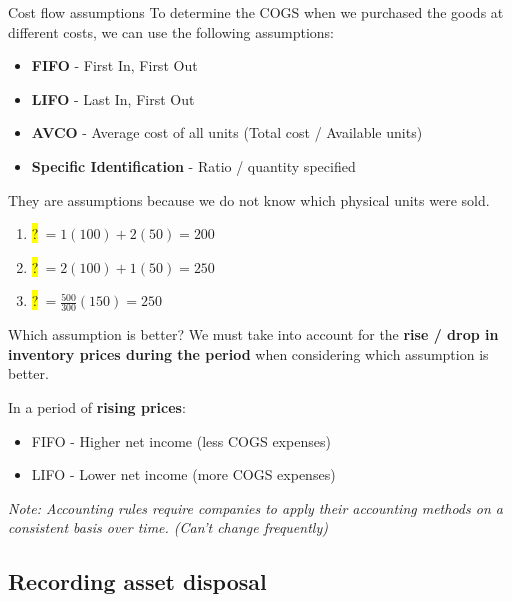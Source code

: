 \begin{theorem}
    {Cost flow assumptions}
    To determine the COGS when we purchased the goods at different costs, we can use the following assumptions:
    \begin{itemize}
        \item \textbf{FIFO} - First In, First Out
        \item \textbf{LIFO} - Last In, First Out
        \item \textbf{AVCO} - Average cost of all units (Total cost / Available units)
        \item \textbf{Specific Identification} - Ratio / quantity specified
    \end{itemize}
    They are assumptions because we do not know which physical units were sold.
    \tcblower
    \begin{enumerate}
        \item \colorbox{yellow}{?}$\ =1(100)+2(50)=200$
        \item \colorbox{yellow}{?}$\ =2(100)+1(50)=250$
        \item \colorbox{yellow}{?}$\ =\frac{500}{300}(150)=250$
    \end{enumerate}
\end{theorem}
\label{thm:cost_flow}

\begin{knBox}
    {Which assumption is better?}
    We must take into account for the \textbf{rise / drop in inventory prices during the period} when considering which assumption is better.

    In a period of \textbf{rising prices}:
    \begin{itemize}
        \item FIFO - Higher net income (less COGS expenses)
        \item LIFO - Lower net income (more COGS expenses)
    \end{itemize}
    \textit{Note: Accounting rules require companies to apply their accounting methods on a consistent basis over time. (Can't change frequently)}
\end{knBox}


\subsection{Recording asset disposal}
\label{subsec:asset_disposal}


